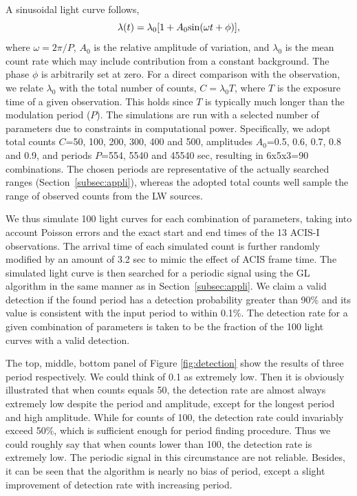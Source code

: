 \documentclass[fleqn,usenatbib]{mnras}
\begin{document}
A sinusoidal light curve follows,
\begin{equation}
\lambda (t)=\lambda_0[1+A_{0}{\rm sin}(\omega t+\phi)], 
\label{eqn:sin}
\end{equation}
where $\omega = 2{\pi}/P$, $A_0$ is the relative amplitude of variation, and $\lambda_0$ is the mean count rate which may include contribution from a constant background. The phase $\phi$ is arbitrarily set at zero.
For a direct comparison with the observation, we relate $\lambda_0$ with the total number of counts, $C = \lambda_0 T$, where $T$ is the exposure time of a given observation. This holds since $T$ is typically much longer than the modulation period ($P$). 
The simulations are run with a selected number of parameters due to constraints in computational power. 
Specifically, we adopt total counts $C$=50, 100, 200, 300, 400 and 500, amplitudes $A_0$=0.5, 0.6, 0.7, 0.8 and 0.9, and periods $P$=554, 5540 and 45540 sec, resulting in 6x5x3=90 combinations. 
The chosen periods are representative of the actually searched ranges (Section~\ref{subsec:appli}), whereas
the adopted total counts well sample the range of observed counts from the LW sources.

We thus simulate 100 light curves for each combination of parameters, taking into account Poisson errors and the exact start and end times of the 13 ACIS-I observations. 
 The arrival time of each simulated count is further randomly modified by an amount of 3.2 sec to mimic the effect of ACIS frame time.
The simulated light curve is then searched for a periodic signal using the GL algorithm in the same manner as in Section~\ref{subsec:appli}.
We claim a valid detection if the found period has a detection probability greater than 90\% and its value is consistent with the input period to within 0.1\%. 
The detection rate for a given combination of parameters is taken to be the fraction of the 100 light curves with a valid detection.

The top, middle, bottom panel of Figure \ref{fig:detection} show the results of three period respectively. 
We could think of 0.1 as extremely low. Then it is obviously illustrated that when counts equals 50, the detection rate are almost always extremely low despite the period and amplitude, except for the longest period and high amplitude. While for counts of 100, the detection rate could invariably exceed 50\%, which is sufficient enough for period finding procedure. Thus we could roughly say that when counts lower than 100, the detection rate is extremely low. The periodic signal in this circumstance are not reliable. Besides, it can be seen that the algorithm is nearly no bias of period, except a slight improvement of detection rate with increasing period.
 
\end{document}
